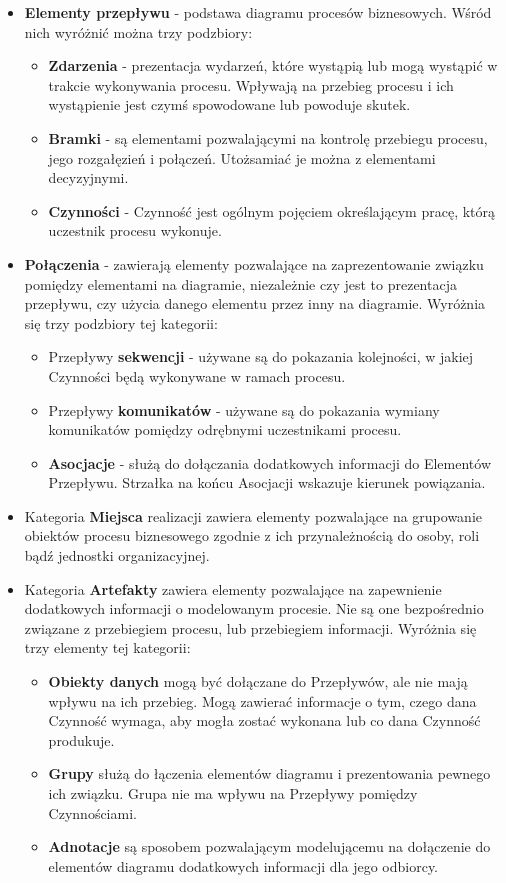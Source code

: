 \begin{itemize}
	\item \textbf{Elementy przepływu} - podstawa diagramu procesów biznesowych. Wśród nich wyróżnić
	można trzy podzbiory:
	\begin{itemize}
		\item \textbf{Zdarzenia} - prezentacja wydarzeń, które wystąpią lub mogą wystąpić w trakcie wykonywania procesu. Wpływają na przebieg procesu i ich wystąpienie jest czymś spowodowane lub powoduje skutek.
		\item \textbf{Bramki} - są elementami pozwalającymi na kontrolę przebiegu procesu, jego rozgałęzień i połączeń. Utożsamiać je można z elementami decyzyjnymi.
		\item \textbf{Czynności} - Czynność jest ogólnym pojęciem określającym pracę, którą uczestnik procesu wykonuje. 
	\end{itemize}
	\item \textbf{Połączenia}  - zawierają elementy pozwalające na zaprezentowanie związku pomiędzy elementami na diagramie, niezależnie czy jest to prezentacja przepływu, czy użycia danego elementu przez inny na diagramie. Wyróżnia się trzy podzbiory tej kategorii:
	\begin{itemize}
		\item Przepływy \textbf{sekwencji} - używane są do pokazania kolejności, w jakiej Czynności będą wykonywane w ramach procesu.
		\item Przepływy \textbf{komunikatów} - używane są do pokazania wymiany komunikatów pomiędzy odrębnymi uczestnikami procesu.
		\item \textbf{Asocjacje} - służą do dołączania dodatkowych informacji do Elementów Przepływu. Strzałka na końcu Asocjacji wskazuje kierunek powiązania.
	\end{itemize}
	\item Kategoria \textbf{Miejsca} realizacji zawiera elementy pozwalające na grupowanie obiektów procesu biznesowego zgodnie z ich przynależnością do osoby, roli bądź jednostki organizacyjnej.
	\item Kategoria \textbf{Artefakty} zawiera elementy pozwalające na zapewnienie dodatkowych informacji o modelowanym procesie. Nie są one bezpośrednio związane z przebiegiem procesu, lub przebiegiem informacji. Wyróżnia się trzy elementy tej kategorii:
	\begin{itemize}
		\item \textbf{Obiekty danych} mogą być dołączane do Przepływów, ale nie mają wpływu na ich przebieg. Mogą zawierać informacje o tym, czego dana Czynność wymaga, aby mogła zostać wykonana lub co dana Czynność produkuje.
		\item \textbf{Grupy} służą do łączenia elementów diagramu i prezentowania pewnego ich związku. Grupa nie ma wpływu na Przepływy pomiędzy Czynnościami.
		\item \textbf{Adnotacje} są sposobem pozwalającym modelującemu na dołączenie do elementów diagramu dodatkowych informacji dla jego odbiorcy.
\\
	\end{itemize}
\end{itemize}

